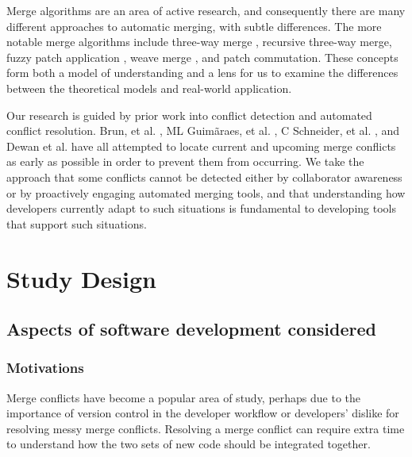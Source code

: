 \documentclass{sig-alternate-05-2015}
\begin{document}
Merge algorithms are an area of active research, and consequently there are many different approaches to automatic merging, with subtle differences. The more notable merge algorithms include three-way merge \cite{livshits07}, recursive three-way merge, fuzzy patch application \cite{brunet06}, weave merge \cite{nguyen07}, and patch commutation. These concepts form both a model of understanding and a lens for us to examine the differences between the theoretical models and real-world application.

Our research is guided by prior work into conflict detection and automated conflict resolution. Brun, et al. \cite{brun11}, ML Guim\~{a}raes, et al. \cite{Guimaraes12}, C Schneider, et al. \cite{schneider04}, and Dewan et al. \cite{dewan07} have all attempted to locate current and upcoming merge conflicts as early as possible in order to prevent them from occurring. We take the approach that some conflicts cannot be detected either by collaborator awareness or by proactively engaging automated merging tools, and that understanding how developers currently adapt to such situations is fundamental to developing tools that support such situations.\\

\section{Study Design}\label{design}
\subsection{Aspects of software development considered} 
\subsubsection{Motivations}
Merge conflicts have become a popular area of study, perhaps due to the importance of version control in the developer workflow or developers' dislike for resolving messy merge conflicts. Resolving a merge conflict can require extra time to understand how the two sets of new code should be integrated together.
\end{document}
